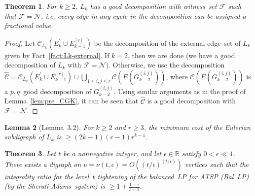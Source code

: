 \documentclass[11pt]{article}
\newtheorem{theorem}{Theorem}[section]
\newtheorem{lemma}[theorem]{Lemma}
\newcommand{\sa}{\textsf{Sherali-Adams}}
\newcommand \reals {\mathbb{R}}
\newcommand{\gdecomp}[1]{\mathcal{C}(#1)}
\newcommand{\gdecomplong}[2]{\mathcal{C}_{#2}(#1)}
\newcommand{\gdecompsymbol}{\widehat{\mathcal{C}}}
\newcommand{\cindset}{\mathcal{N}}
\newcommand{\fracset}{\mathcal{F}}
\begin{document}
\begin{theorem}
\label{thm:CGK}
For $k\geq 2$,
$L_{k}$ has a good decomposition
with witness~set $\fracset$ such that $\fracset=\cindset$,
i.e. every edge in any cycle in the decomposition can be assigned a fractional value. 
\end{theorem}
\begin{proof}
Let $\gdecomplong{E_k^{'}\cup E^{[r]}_{k-1}}{L_k}$
be the decomposition of the external edge~set of $L_{k}$
given by Fact~\ref{fact:Lk-external}.
If $k=2$, then we are done (we have a good decomposition of $L_{k}$
with $\fracset=\cindset$).
Otherwise, we use the decomposition
$\gdecompsymbol=\gdecomplong{E_k^{'}\cup{E^{[r]}_{k-1}}}{L_{k}} \cup
	\bigcup_{1\le{i,j}\le{r}} \gdecomp{E(G^{(i,j)}_{k-2})}$,
where $\gdecomp{E(G^{(i,j)}_{k-2})}$ is a
$p,q$~good decomposition of $G^{(i,j)}_{k-2}$.
Using similar arguments as in the proof of Lemma~\ref{lem:pre_CGK},
it can be seen that $\gdecompsymbol$ is a good decomposition with
$\fracset=\cindset$.
\end{proof}


\begin{lemma}[Lemma~3.2\cite{CGK06}]
\label{lem:CGK}
For $k\geq 2$ and $r\geq 3$, the minimum cost of
the Eulerian subdigraph of $L_k$ is $\geq (2k-1)(r-1)r^{k-1}$.
\end{lemma}

\begin{theorem}
\label{thm:IR-CGK}
Let $t$ be a nonnegative integer, and let $\epsilon\in\reals$
satisfy $0<\epsilon\ll{1}$.
There exists a digraph on
$\nu=\nu(t,\epsilon)=O((t/\epsilon)^{(t/\epsilon)})$
vertices such that the integrality ratio for
the level~$t$ tightening of the balanced~LP for ATSP (Bal~LP)
(by the \sa\ system)
is $\geq 1+\frac{1-\epsilon}{t+1}$.
\end{theorem}
\end{document}
